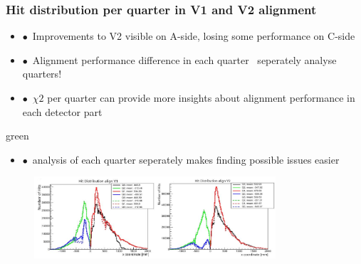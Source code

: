 \documentclass[aspectratio=1610, 12pt, xcolor=dvipsnames]{beamer}
\begin{document}
\begin{frame}\frametitle{Hit distribution per quarter in V1 and V2 alignment}
  \begin{itemize}
    \item $\bullet$\, Improvements to V2 visible on A-side, losing some performance on C-side
    \item $\bullet$\, Alignment performance difference in each quarter \to\, seperately analyse quarters!
    \item $\bullet$\, $\chi2$ per quarter can provide more insights about alignment performance in each detector part
  \end{itemize}
  \begin{mybox}{green}{}
    \begin{itemize}
      \item $\bullet$\, analysis of each quarter seperately makes finding possible issues easier
    \end{itemize}
  \end{mybox}
  \begin{figure}
      \includegraphics[width=0.8\textwidth]{logos/v1_v2.png}%
  \end{figure}
\end{frame}

\end{document}
